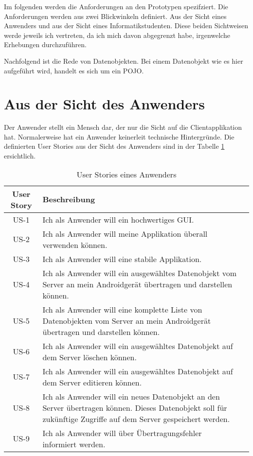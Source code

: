 \documentclass[abstracton, listof=totocnumbered,
bibliography=totocnumbered]{scrreprt}
\begin{document}
  Im folgenden werden die Anforderungen an den Prototypen spezifziert. Die
  Anforderungen werden aus zwei Blickwinkeln definiert. Aus der Sicht eines
  Anwenders und aus der Sicht eines Informatikstudenten. Diese beiden
  Sichtweisen werde jeweils ich vertreten, da ich mich davon abgegrenzt habe,
  irgenwelche Erhebungen durchzuführen.
  
  Nachfolgend ist die Rede von Datenobjekten. Bei einem Datenobjekt wie es hier
  aufgeführt wird, handelt es sich um ein \ac{POJO}. 
  
  \newpage
  
  \section{Aus der Sicht des Anwenders}
  
  Der Anwender stellt ein Mensch dar, der nur die Sicht auf die
  Clientapplikation hat. Normalerweise hat ein Anwender keinerleit technische
  Hintergründe. Die definierten User Stories aus der Sicht des Anwenders sind in
  der Tabelle \ref{tab:anwenderUserStories} ersichtlich.
  \newline
  
  \begin{table}[h]
    \begin{center}
      \begin{tabular}{cp{13cm}l}
        \toprule
        User Story & Beschreibung \\
        \midrule
        US-1 & Ich als Anwender will ein hochwertiges \ac{GUI}. \\
        US-2 & Ich als Anwender will meine Applikation überall verwenden können. \\
        US-3 & Ich als Anwender will eine stabile Applikation. \\
        US-4 & Ich als Anwender will ein ausgewähltes Datenobjekt vom Server an mein
        Androidgerät übertragen und darstellen können. \\
        US-5 & Ich als Anwender will eine komplette Liste von Datenobjekten vom
        Server an mein Androidgerät übertragen und darstellen können. \\
        US-6 & Ich als Anwender will ein ausgewähltes Datenobjekt auf dem Server
        löschen können. \\
        US-7 & Ich als Anwender will ein ausgewähltes Datenobjekt auf dem Server
        editieren können. \\
        US-8 & Ich als Anwender will ein neues Datenobjekt an den Server übertragen
        können. Dieses Datenobjekt soll für zukünftige Zugriffe auf dem Server
        gespeichert werden. \\
        US-9 & Ich als Anwender will über Übertragungsfehler informiert werden. \\
        \bottomrule
      \end{tabular}
      \caption{User Stories eines Anwenders}
      \label{tab:anwenderUserStories}
    \end{center}
  \end{table}
  
\end{document}
